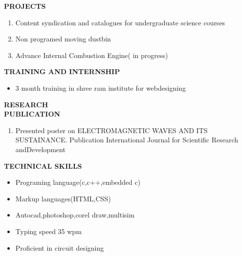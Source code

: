 \documentclass{article}
\begin{document}
\begin{flushleft}
	\vspace{0.30in}
	\textbf{PROJECTS}
	\begin{enumerate}
		\item Content syndication and catalogues for undergraduate science courses\\
		\item Non programed moving dustbin\\
		\item Advance Internal Combustion Engine( in progress)\\
		
	\end{enumerate}
\end{flushleft}

\begin{flushleft}
	\vspace{0.1in}
	\textbf{TRAINING AND INTERNSHIP}
	\begin{itemize}
		\item 3 month training in shree ram institute for webdesigning
	\end{itemize}
\end{flushleft}

\begin{flushleft}
	\vspace{.30in}
	\textbf{RESEARCH \\PUBLICATION}
	\begin{enumerate}
		\item Presented poster on ELECTROMAGNETIC WAVES AND ITS SUSTAINANCE. Publication International Journal for Scientific Research andDevelopment
	\end{enumerate}
\end{flushleft}

\begin{flushleft}
	\vspace{0.2in}
	\textbf{TECHNICAL SKILLS}
	\begin{itemize}
		\item Programing language(c,c++,embedded c)
		\item Markup languages(HTML,CSS)
		\item Autocad,photoshop,corel draw,multisim
		\item Typing speed 35 wpm
		\item Proficient in circuit designing
	\end{itemize}
\end{flushleft}
\end{document}

